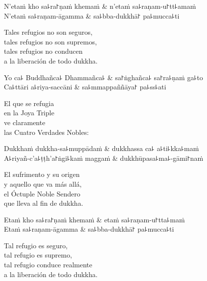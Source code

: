 \begin{twochants}
  N'etaṁ kho sa꜕ra꜓ṇaṁ khemaṁ & n'etaṁ sa꜕raṇam-u꜓tt꜕amaṁ \\
  N'etaṁ sa꜕raṇam-āgamma & sa꜕bba-dukkhā꜓ pa꜕mucca꜕ti \\
\end{twochants}

\begin{english}
  Tales refugios no son seguros,\\
  tales refugios no son supremos,\\
  tales refugios no conducen\\
  a la liberación de todo dukkha.
\end{english}

\begin{twochants}
  Yo ca꜕ Buddhañca꜕ Dhammañca꜕ & sa꜓ṅghañca꜕ sa꜓ra꜕ṇaṁ ga꜕to \\
  Ca꜕ttāri a꜕riya-saccāni & sa꜕mmappaññāya꜓ pa꜕ss꜕ati \\
\end{twochants}

\begin{english}
  El que se refugia\\
  en la Joya Triple\\
  ve claramente\\
  las Cuatro Verdades Nobles:
\end{english}

\begin{twochants}
  Dukkhaṁ dukkha-sa꜕muppādaṁ & dukkhassa ca꜕ a꜕ti꜕kka꜕maṁ \\
  A꜕riyañ-c'a꜕ṭṭh'a꜓ṅgi꜕kaṁ maggaṁ & dukkhūpasa꜕ma꜕-gāmi꜓naṁ \\
\end{twochants}

\begin{english}
  El sufrimento y su origen \\
  y aquello que va más allá,\\
  el Óctuple Noble Sendero\\
  que lleva al fin de dukkha.
\end{english}

\begin{twochants}
  Etaṁ kho sa꜕ra꜓ṇaṁ khemaṁ & etaṁ sa꜕raṇam-u꜓tta꜕maṁ \\
  Etaṁ sa꜕raṇam-āgamma & sa꜕bba-dukkhā꜓ pa꜕mucca꜕ti \\
\end{twochants}

\begin{english}
  Tal refugio es seguro,\\
  tal refugio es supremo,\\
  tal refugio conduce realmente\\
  a la liberación de todo dukkha.
\end{english}

